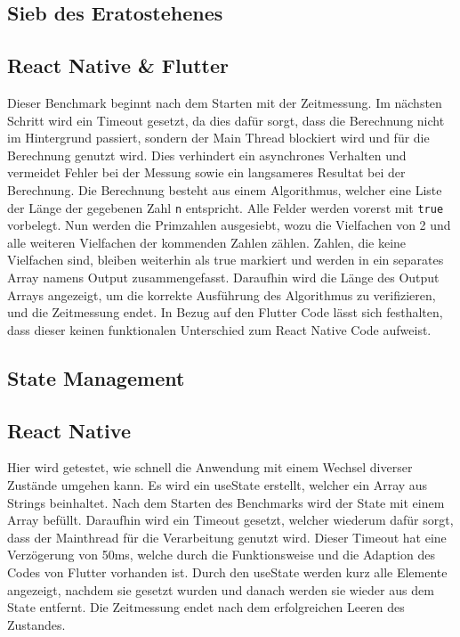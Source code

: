 \subsection{Sieb des Eratostehenes}

\subsection*{React Native \& Flutter}
Dieser Benchmark beginnt nach dem Starten mit der Zeitmessung. Im nächsten Schritt wird ein Timeout gesetzt, da dies dafür sorgt, dass die Berechnung nicht im Hintergrund passiert, sondern der Main Thread blockiert wird und für die Berechnung genutzt wird. Dies verhindert ein asynchrones Verhalten und vermeidet Fehler bei der Messung sowie ein langsameres Resultat bei der Berechnung. Die Berechnung besteht aus einem Algorithmus, welcher eine Liste der Länge der gegebenen Zahl \texttt{n} entspricht. Alle Felder werden vorerst mit \texttt{true} vorbelegt. Nun werden die Primzahlen ausgesiebt, wozu die Vielfachen von 2 und alle weiteren Vielfachen der kommenden Zahlen zählen. Zahlen, die keine Vielfachen sind, bleiben weiterhin als true markiert und werden in ein separates Array namens Output zusammengefasst. Daraufhin wird die Länge des Output Arrays angezeigt, um die korrekte Ausführung des Algorithmus zu verifizieren, und die Zeitmessung endet. In Bezug auf den Flutter Code lässt sich festhalten, dass dieser keinen funktionalen Unterschied zum React Native Code aufweist.

\subsection{State Management}

\subsection*{React Native}
Hier wird getestet, wie schnell die Anwendung mit einem Wechsel diverser Zustände umgehen kann. Es wird ein useState erstellt, welcher ein Array aus Strings beinhaltet. Nach dem Starten des Benchmarks wird der State mit einem Array befüllt. Daraufhin wird ein Timeout gesetzt, welcher wiederum dafür sorgt, dass der Mainthread für die Verarbeitung genutzt wird. Dieser Timeout hat eine Verzögerung von 50ms, welche durch die Funktionsweise und die Adaption des Codes von Flutter vorhanden ist. Durch den useState werden kurz alle Elemente angezeigt, nachdem sie gesetzt wurden und danach werden sie wieder aus dem State entfernt. Die Zeitmessung endet nach dem erfolgreichen Leeren des Zustandes.

